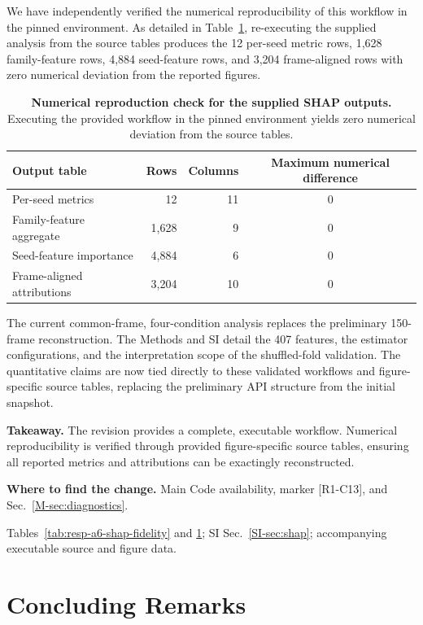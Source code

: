 \documentclass[11pt]{article}
\newcommand{\location}[2]{\par{\small\textbf{Where to find the change.} #1\par #2}\par}
\begin{document}
We have independently verified the numerical reproducibility of this workflow in the pinned environment. As detailed in Table~\ref{tab:resp-c13-shap-reproduction}, re-executing the supplied analysis from the source tables produces the 12 per-seed metric rows, 1,628 family-feature rows, 4,884 seed-feature rows, and 3,204 frame-aligned rows with zero numerical deviation from the reported figures. 

\begin{table}[!htbp]
\centering\small
\caption{\textbf{Numerical reproduction check for the supplied SHAP outputs.} Executing the provided workflow in the pinned environment yields zero numerical deviation from the source tables.}
\label{tab:resp-c13-shap-reproduction}
\begin{tabular}{lrrc}
\toprule
Output table & Rows & Columns & Maximum numerical difference \\
\midrule
Per-seed metrics & 12 & 11 & 0 \\
Family-feature aggregate & 1,628 & 9 & 0 \\
Seed-feature importance & 4,884 & 6 & 0 \\
Frame-aligned attributions & 3,204 & 10 & 0 \\
\bottomrule
\end{tabular}
\end{table}

The current common-frame, four-condition analysis replaces the preliminary 150-frame reconstruction. The Methods and SI detail the 407 features, the estimator configurations, and the interpretation scope of the shuffled-fold validation. The quantitative claims are now tied directly to these validated workflows and figure-specific source tables, replacing the preliminary API structure from the initial snapshot.

\textbf{Takeaway.} The revision provides a complete, executable workflow. Numerical reproducibility is verified through provided figure-specific source tables, ensuring all reported metrics and attributions can be exactingly reconstructed.
\location{Main Code availability, marker [R1-C13], and Sec.~\ref{M-sec:diagnostics}.}{Tables~\ref{tab:resp-a6-shap-fidelity} and \ref{tab:resp-c13-shap-reproduction}; SI Sec.~\ref{SI-sec:shap}; accompanying executable source and figure data.}


\section*{Concluding Remarks}
\end{document}
